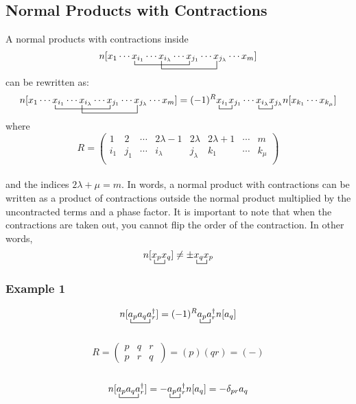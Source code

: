 \documentclass{article}
\newcommand{\ctr}{\bcontraction}
\newcommand{\dg}{\ensuremath{^\dagger} }
\newcommand{\cd}{\ensuremath{\cdots} }
\begin{document}
\subsection{Normal Products with Contractions}
A normal products with contractions inside
\[ 
\ctr{n[x_1 \cd }{x}{{}_{i_1} \cd x_{i_\lambda} \cd }{x}
\ctr[2ex]{n[x_1 \cd x_{i_1} \cd}{ x}{{}_{i_\lambda} \cd x_{j_1} \cd }{x} 
n[x_1 \cd x_{i_1} \cd x_{i_\lambda} \cd x_{j_1} \cd x_{j_\lambda} \cd x_m] 
\] 
can be rewritten as: 
\[ 
\ctr{n[x_1 \cd }{x}{{}_{i_1} \cd x_{i_\lambda} \cd }{x}
\ctr[2ex]{n[x_1 \cd x_{i_1} \cd}{ x}{{}_{i_\lambda} \cd x_{j_1} \cd }{x} 
n[x_1 \cd x_{i_1} \cd x_{i_\lambda} \cd x_{j_1} \cd x_{j_\lambda} \cd x_m] 
= 
\ctr{(-1)^R}{x}{{}_{i_1} }{x}
\ctr{(-1)^R x_{i_1}x_{j_1} \cd}{x}{{}_{i_\lambda} }{x}
(-1)^R x_{i_1}x_{j_1} \cd x_{i_\lambda} x_{j_\lambda} n[x_{k_1} \cd x_{k_\mu}]
\] 
where 
\[
R = 
\begin{pmatrix}
1 & 2 & \cd & 2\lambda -1 & 2\lambda & 2\lambda + 1&\cd & m  \\
i_1 & j_1 & \cd& i_\lambda & j_\lambda  &k_1 & \cd & k_\mu \\
\end{pmatrix}
\] \\
and the indices $2\lambda + \mu = m$.
In words, a normal product with contractions can be written as a product of contractions outside the normal product multiplied by the uncontracted terms and a phase factor. 
It is important to note that when the contractions are taken out, you cannot flip the order of the contraction.
In other words, 
\[ n[\ctr{}{x}{{}_p}{x}
x_p x_q ] \neq \pm \ctr{}{x}{{}_q}{x}x_q x_p  \]
\subsubsection{Example 1}
\[\ctr{n[}{a}{{}_p a_q }{a}
\ctr{n[a_p a_q a_r\dg] = (-)^R a}{a}{_p}{a}
n[a_p a_q a_r\dg] = (-1)^R a_p a_r\dg n[a_q] \] \\
\[
R = 
\begin{pmatrix}
p & q & r  \\
p & r& q\
\end{pmatrix}
= (p)(qr) = (-)
\] \\
\[\ctr{n[}{a}{{}_p a_q }{a}
\ctr{n[a_p a_q a_r\dg] = -}{a}{{}_p}{a}
n[a_p a_q a_r\dg] = - a_p a_r\dg n[a_q] = -\delta_{pr}a_q \]
\end{document}
